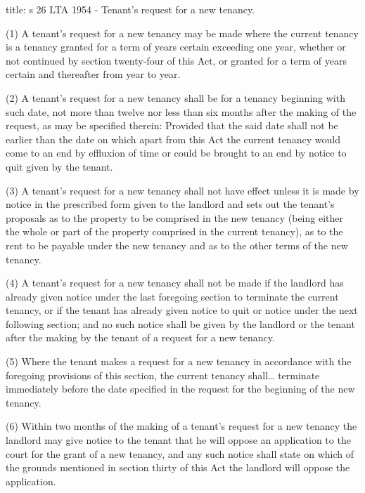 \documentclass[
]{article}
\newenvironment{Shaded}{}{}
\newcommand{\NormalTok}[1]{#1}
\begin{document}
\begin{Shaded}
\begin{Highlighting}[]
\NormalTok{title: s 26 LTA 1954 {-} Tenant’s request for a new tenancy.}

\NormalTok{(1) A tenant’s request for a new tenancy may be made where the current tenancy is a tenancy granted for a term of years certain exceeding one year, whether or not continued by section twenty{-}four of this Act, or granted for a term of years certain and thereafter from year to year.}

\NormalTok{(2) A tenant’s request for a new tenancy shall be for a tenancy beginning with such date, not more than twelve nor less than six months after the making of the request, as may be specified therein: Provided that the said date shall not be earlier than the date on which apart from this Act the current tenancy would come to an end by effluxion of time or could be brought to an end by notice to quit given by the tenant.}

\NormalTok{(3) A tenant’s request for a new tenancy shall not have effect unless it is made by notice in the prescribed form given to the landlord and sets out the tenant’s proposals as to the property to be comprised in the new tenancy (being either the whole or part of the property comprised in the current tenancy), as to the rent to be payable under the new tenancy and as to the other terms of the new tenancy.}

\NormalTok{(4) A tenant’s request for a new tenancy shall not be made if the landlord has already given notice under the last foregoing section to terminate the current tenancy, or if the tenant has already given notice to quit or notice under the next following section; and no such notice shall be given by the landlord or the tenant after the making by the tenant of a request for a new tenancy.}

\NormalTok{(5) Where the tenant makes a request for a new tenancy in accordance with the foregoing provisions of this section, the current tenancy shall… terminate immediately before the date specified in the request for the beginning of the new tenancy.}

\NormalTok{(6) Within two months of the making of a tenant’s request for a new tenancy the landlord may give notice to the tenant that he will oppose an application to the court for the grant of a new tenancy, and any such notice shall state on which of the grounds mentioned in section thirty of this Act the landlord will oppose the application.}
\end{Highlighting}
\end{Shaded}
\end{document}
